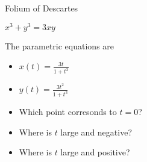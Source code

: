 \documentclass{ximera}
\begin{document}
\begin{example} Folium of Descartes

$x^3 + y^3 = 3 x y$

The parametric equations are

\begin{itemize}
\item $x(t) = \frac{3t}{1+t^3}$
\item $y(t) = \frac{3t^2}{1+t^3}$
\end{itemize}






\begin{center}
\end{center}




\begin{itemize}
\item Which point corresonds to $t=0$? 
\item Where is $t$ large and negative?
\item Where is $t$ large and positive?
\end{itemize}






\end{example}
\end{document}
